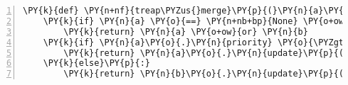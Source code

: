 \begin{Verbatim}[commandchars=\\\{\},numbers=left,firstnumber=1,stepnumber=1,codes={\catcode`\$=3\catcode`\^=7\catcode`\_=8}]
\PY{k}{def} \PY{n+nf}{treap\PYZus{}merge}\PY{p}{(}\PY{n}{a}\PY{p}{,} \PY{n}{b}\PY{p}{)}\PY{p}{:}
    \PY{k}{if} \PY{n}{a} \PY{o}{==} \PY{n+nb+bp}{None} \PY{o+ow}{or} \PY{n}{b} \PY{o}{==} \PY{n+nb+bp}{None}\PY{p}{:}
        \PY{k}{return} \PY{n}{a} \PY{o+ow}{or} \PY{n}{b}
    \PY{k}{if} \PY{n}{a}\PY{o}{.}\PY{n}{priority} \PY{o}{\PYZgt{}} \PY{n}{b}\PY{o}{.}\PY{n}{priority}\PY{p}{:}
        \PY{k}{return} \PY{n}{a}\PY{o}{.}\PY{n}{update}\PY{p}{(}\PY{n}{right}\PY{o}{=}\PY{n}{treap\PYZus{}merge}\PY{p}{(}\PY{n}{a}\PY{o}{.}\PY{n}{right}\PY{p}{,} \PY{n}{b}\PY{p}{)}\PY{p}{)}
    \PY{k}{else}\PY{p}{:}
        \PY{k}{return} \PY{n}{b}\PY{o}{.}\PY{n}{update}\PY{p}{(}\PY{n}{left}\PY{o}{=}\PY{n}{treap\PYZus{}merge}\PY{p}{(}\PY{n}{a}\PY{p}{,} \PY{n}{b}\PY{o}{.}\PY{n}{left}\PY{p}{)}\PY{p}{)}
\end{Verbatim}
